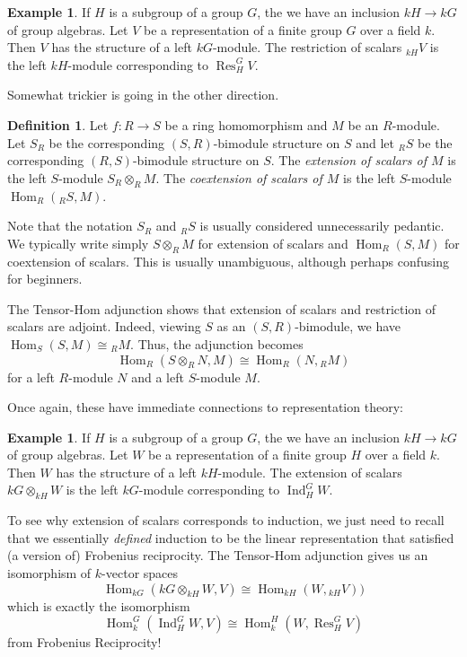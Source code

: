 \documentclass[12pt]{article}
\theoremstyle{plain}
\theoremstyle{definition}
\newtheorem{definition}[theorem]{Definition}
\newtheorem{example}[theorem]{Example}
\theoremstyle{remark}
\numberwithin{equation}{section}
\begin{document}
\begin{example}
If $H$ is a subgroup of a group $G$, the we have an inclusion
$kH \to kG$ of group algebras.
Let $V$ be a representation of a finite group $G$ over a field $k$.
Then $V$ has the structure of a left $kG$-module.
The restriction of scalars ${}_{kH}V$ is the left $kH$-module
corresponding to $\operatorname{Res}_H^G V$. 
\end{example}

Somewhat trickier is going in the other direction.

\begin{definition}
Let $f : R \to S$ be a ring homomorphism and $M$ be an $R$-module.
Let $S_R$ be the corresponding $(S,R)$-bimodule structure on $S$
and let ${}_RS$ be the corresponding $(R,S)$-bimodule structure on $S$.
The \emph{extension of scalars of $M$}
is the left $S$-module $S_R \otimes_R M$.
The \emph{coextension of scalars of $M$}
is the left $S$-module $\operatorname{Hom}_R({}_RS,M)$.
\end{definition}

Note that the notation $S_R$ and ${}_RS$ is usually considered
unnecessarily pedantic.
We typically write simply $S \otimes_R M$ for extension of scalars
and $\operatorname{Hom}_R(S,M)$ for coextension of scalars.
This is usually unambiguous, although perhaps confusing for beginners.

The Tensor-Hom adjunction shows that extension of scalars
and restriction of scalars are adjoint.
Indeed, viewing $S$ as an $(S,R)$-bimodule,
we have $\operatorname{Hom}_S(S,M) \cong {}_RM$.
Thus, the adjunction becomes
\[
\operatorname{Hom}_R(S \otimes_R N,M)
\cong \operatorname{Hom}_R(N,{}_RM)
\]
for a left $R$-module $N$ and a left $S$-module $M$.

Once again, these have immediate connections to representation theory:

\begin{example}
If $H$ is a subgroup of a group $G$, the we have an inclusion
$kH \to kG$ of group algebras.
Let $W$ be a representation of a finite group $H$ over a field $k$.
Then $W$ has the structure of a left $kH$-module.
The extension of scalars $kG \otimes_{kH} W$
is the left $kG$-module corresponding to $\operatorname{Ind}_H^G W$.
\end{example} 

To see why extension of scalars corresponds to induction, we just need
to recall that we essentially \emph{defined} induction to be the linear
representation that satisfied (a version of) Frobenius reciprocity.
The Tensor-Hom adjunction gives us an isomorphism of $k$-vector spaces
\[
\operatorname{Hom}_{kG}(kG \otimes_{kH} W,V)
\cong \operatorname{Hom}_{kH}(W,{}_{kH}V))
\]
which is exactly the isomorphism
\[
\operatorname{Hom}_k^G(\operatorname{Ind}_H^G W,V)
\cong \operatorname{Hom}_k^H(W,\operatorname{Res}_H^G V)
\]
from Frobenius Reciprocity!
\end{document}
